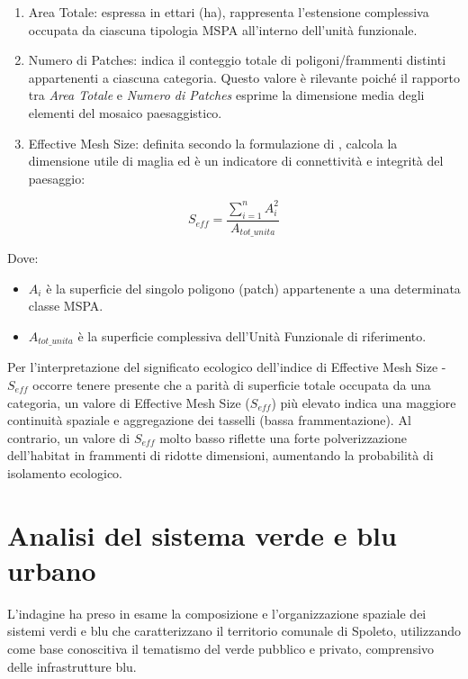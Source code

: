 \documentclass[
  a4paper,
]{book}
\providecommand{\tightlist}{%
  \setlength{\itemsep}{0pt}\setlength{\parskip}{0pt}}
\begin{document}
\begin{enumerate}
\def\labelenumi{\arabic{enumi}.}
\tightlist
\item
  Area Totale: espressa in ettari (ha), rappresenta l'estensione complessiva occupata da ciascuna tipologia MSPA all'interno dell'unità funzionale.
\item
  Numero di Patches: indica il conteggio totale di poligoni/frammenti distinti appartenenti a ciascuna categoria. Questo valore è rilevante poiché il rapporto tra \emph{Area Totale} e \emph{Numero di Patches} esprime la dimensione media degli elementi del mosaico paesaggistico.
\item
  Effective Mesh Size: definita secondo la formulazione di \citep{jaeger2000}, calcola la dimensione utile di maglia ed è un indicatore di connettività e integrità del paesaggio:
\end{enumerate}

\[S_{eff} = \frac{\sum_{i=1}^{n} A_i^2}{A_{tot\_unita}}\]

Dove:

\begin{itemize}
\tightlist
\item
  \(A_i\) è la superficie del singolo poligono (patch) appartenente a una determinata classe MSPA.
\item
  \(A_{tot\_unita}\) è la superficie complessiva dell'Unità Funzionale di riferimento.
\end{itemize}

Per l'interpretazione del significato ecologico dell'indice di Effective Mesh Size - \(S_{eff}\) occorre tenere presente che a parità di superficie totale occupata da una categoria, un valore di Effective Mesh Size (\(S_{eff}\)) più elevato indica una maggiore continuità spaziale e aggregazione dei tasselli (bassa frammentazione).
Al contrario, un valore di \(S_{eff}\) molto basso riflette una forte polverizzazione dell'habitat in frammenti di ridotte dimensioni, aumentando la probabilità di isolamento ecologico.

\section{Analisi del sistema verde e blu urbano}\label{analisi-del-sistema-verde-e-blu-urbano}

L'indagine ha preso in esame la composizione e l'organizzazione spaziale dei sistemi verdi e blu che caratterizzano il territorio comunale di Spoleto, utilizzando come base conoscitiva il tematismo del verde pubblico e privato, comprensivo delle infrastrutture blu.
\end{document}
